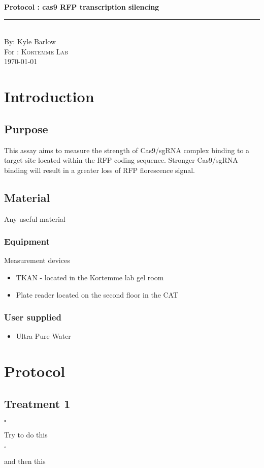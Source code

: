 \documentclass[a4paper,12pt]{article}
\newcommand{\protocol}{cas9 RFP transcription silencing}
\newcommand{\labtitle}{Kortemme Lab}
\newcommand{\authorname}{Kyle Barlow}
\newcommand{\checkbox}{$\square$\hspace{1mm}}
\newcommand{\icb}{\item \checkbox}
\begin{document}



\begin{titlepage}
\begin{center}
{\LARGE \textbf{Protocol : \protocol} \\ \vspace{4pt}}
\rule[13pt]{\textwidth}{1pt} \\ \vspace{150pt}
{\large By: \authorname \\ \vspace{10pt}
{\large For : \textsc{\labtitle} \\ \vspace{10pt}}
\today}
\end{center}

\end{titlepage}

\newpage
\thispagestyle{empty}           %
\tableofcontents
\clearpage                      %

\setcounter{page}{1}

\section{Introduction}
\subsection{Purpose}
This assay aims to measure the strength of Cas9/sgRNA complex
binding to a target site located within the RFP coding sequence.
Stronger Cas9/sgRNA binding will result in a greater loss of
RFP florescence signal.
\subsection{Material}
Any useful material
\subsubsection{Equipment}
Measurement devices
\begin{itemize}
\item TKAN - located in the Kortemme lab gel room
\item Plate reader located on the second floor in the CAT
\end{itemize}

\subsubsection{User supplied}
\begin{itemize}
\item Ultra Pure Water
\end{itemize}

\section{Protocol}
\subsection{Treatment 1}
\begin{enumerate}
  {\icb} Try to do this
  {\icb} and then this
\end{enumerate}
\end{document}
